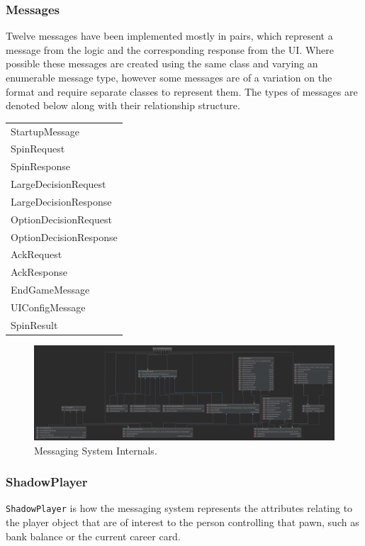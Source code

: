\documentclass[a4paper, 11pt]{article}
\begin{document}
	\subsubsection*{Messages}
	Twelve messages have been implemented mostly in pairs, which represent a message from the logic and the corresponding response from the UI. Where possible these messages are created using the same class and varying an enumerable message type, however some messages are of a variation on the format and require separate classes to represent them. The types of messages are denoted below along with their relationship structure.
	\begin{table}[!ht]
		\begin{flushleft} 
			\begin{tabular}{l} 
				StartupMessage\\
				SpinRequest\\
				SpinResponse\\
				LargeDecisionRequest\\
				LargeDecisionResponse\\
				OptionDecisionRequest\\
				OptionDecisionResponse\\
				AckRequest\\
				AckResponse\\
				EndGameMessage\\
				UIConfigMessage\\
				SpinResult\\	
			\end{tabular}
		\end{flushleft}
	\end{table}
	\begin{figure}[!h]
		\centering
		\includegraphics[scale=.125]{uml/messaging_internals_uml}
		\caption{Messaging System Internals.}
		\label{fig:messages_uml}
	\end{figure}
	\subsubsection*{ShadowPlayer}
	\texttt{ShadowPlayer} is how the messaging system represents the attributes relating to the player object that are of interest to the person controlling that pawn, such as bank balance or the current career card.
	
\end{document}
